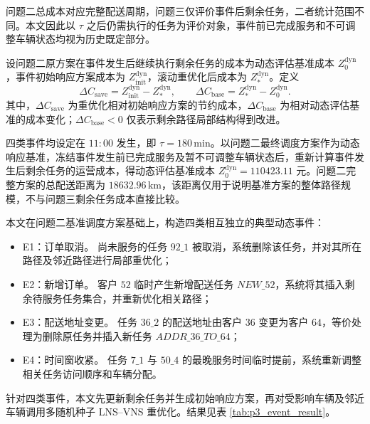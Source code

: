 \documentclass[withoutpreface,bwprint]{cumcmthesis} %
\begin{document}
问题二总成本对应完整配送周期，问题三仅评价事件后剩余任务，二者统计范围不同。本文因此以 $\tau$ 之后仍需执行的任务为评价对象，事件前已完成服务和不可调整车辆状态均视为历史既定部分。

设问题二原方案在事件发生后继续执行剩余任务的成本为动态评估基准成本 $Z_0^{\mathrm{dyn}}$，事件初始响应方案成本为 $Z_{\mathrm{init}}^{\mathrm{dyn}}$，滚动重优化后成本为 $Z_*^{\mathrm{dyn}}$。定义
\begin{equation}
\Delta C_{\mathrm{save}}
=
Z_{\mathrm{init}}^{\mathrm{dyn}}-Z_*^{\mathrm{dyn}},
\qquad
\Delta C_{\mathrm{base}}
=
Z_*^{\mathrm{dyn}}-Z_0^{\mathrm{dyn}}.
\end{equation}
其中，$\Delta C_{\mathrm{save}}$ 为重优化相对初始响应方案的节约成本，$\Delta C_{\mathrm{base}}$ 为相对动态评估基准的成本变化；$\Delta C_{\mathrm{base}}<0$ 仅表示剩余路径局部结构得到改进。

四类事件均设定在 $11{:}00$ 发生，即 $\tau=180\,\mathrm{min}$。以问题二最终调度方案作为动态响应基准，冻结事件发生前已完成服务及暂不可调整车辆状态后，重新计算事件发生后剩余任务的运营成本，得动态评估基准成本 $Z_0^{\mathrm{dyn}}=110423.11$ 元。问题二完整方案的总配送距离为 $18632.96\,\mathrm{km}$，该距离仅用于说明基准方案的整体路径规模，不与问题三剩余任务成本直接比较。

本文在问题二基准调度方案基础上，构造四类相互独立的典型动态事件：

\begin{itemize}
    \item {\heiti E1：订单取消。} 尚未服务的任务 $92\_1$ 被取消，系统删除该任务，并对其所在路径及邻近路径进行局部重优化；
    \item {\heiti E2：新增订单。} 客户 $52$ 临时产生新增配送任务 $NEW\_52$，系统将其插入剩余待服务任务集合，并重新优化相关路径；
    \item {\heiti E3：配送地址变更。} 任务 $36\_2$ 的配送地址由客户 $36$ 变更为客户 $64$，等价处理为删除原任务并插入新任务 $ADDR\_36\_TO\_64$；
    \item {\heiti E4：时间窗收紧。} 任务 $7\_1$ 与 $50\_4$ 的最晚服务时间临时提前，系统重新调整相关任务访问顺序和车辆分配。
\end{itemize}

针对四类事件，本文先更新剩余任务并生成初始响应方案，再对受影响车辆及邻近车辆调用多随机种子 LNS--VNS 重优化。结果见表 \ref{tab:p3_event_result}。
\end{document}
